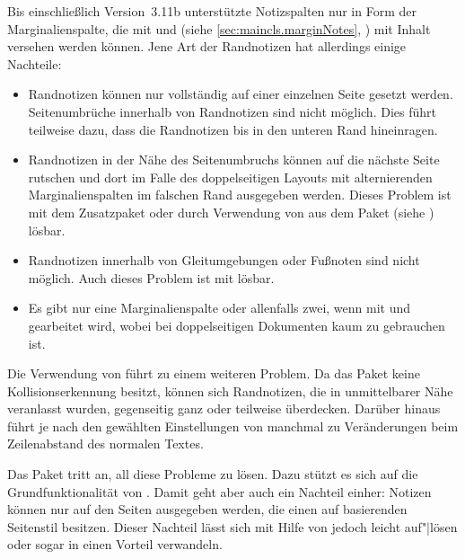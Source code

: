 \BeginIndexGroup
{}%
Bis einschließlich Version~3.11b unterstützte \KOMAScript{} Notizspalten nur
in Form der Marginalienspalte, die mit  und
 (siehe \autoref{sec:maincls.marginNotes},
) mit Inhalt versehen werden
können. Jene Art der Randnotizen hat allerdings einige Nachteile:
\begin{itemize}
\item Randnotizen können nur vollständig auf einer einzelnen Seite gesetzt
  werden. Seitenumbrüche innerhalb von Randnotizen
  sind nicht möglich. Dies führt teilweise dazu, dass die Randnotizen bis in
  den unteren Rand hineinragen.
\item Randnotizen in der Nähe des Seitenumbruchs können auf die nächste Seite
  rutschen und dort im Falle des doppelseitigen Layouts mit alternierenden
  Marginalienspalten im falschen Rand
  ausgegeben werden. Dieses Problem ist mit dem Zusatzpaket
   oder durch Verwendung von
   aus dem Paket
   (siehe
  \cite{package:marginnote}) lösbar.
\item Randnotizen innerhalb von Gleitumgebungen oder
  Fußnoten sind nicht möglich. Auch dieses Problem ist mit
   lösbar.
\item Es gibt nur eine Marginalienspalte oder
  allenfalls zwei, wenn mit  und
   gearbeitet wird, wobei  bei
  doppelseitigen Dokumenten kaum zu gebrauchen ist.
\end{itemize}
Die Verwendung von  führt zu
einem weiteren Problem. Da das Paket keine Kollisionserkennung besitzt, können
sich Randnotizen, die in unmittelbarer Nähe veranlasst wurden, gegenseitig
ganz oder teilweise überdecken. Darüber hinaus führt  je
nach den gewählten Einstellungen von  manchmal zu
Veränderungen beim Zeilenabstand des normalen Textes.

Das Paket  tritt an, all diese Probleme zu
lösen. Dazu stützt es sich auf die Grundfunktionalität von
\hyperref[cha:scrlayer]{}%
. Damit geht aber
auch ein Nachteil einher: Notizen können nur auf den Seiten
ausgegeben werden, die einen auf \hyperref[cha:scrlayer]{}
basierenden Seitenstil besitzen. Dieser Nachteil lässt sich mit Hilfe von
\hyperref[cha:scrlayer-scrpage]{}%
%
 jedoch leicht auf"|lösen oder sogar in einen
Vorteil verwandeln.


